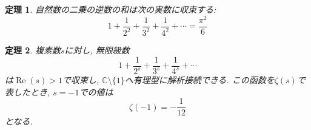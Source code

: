 \documentclass[dvipdfmx]{jsarticle}
\newtheorem{them}{定理}
\begin{document}
  \begin{them}
    自然数の二乗の逆数の和は次の実数に収束する:
    \[
      1 + \frac{1}{2^2} + \frac{1}{3^2} + \frac{1}{4^2} + \cdots = \frac{\pi^2}{6}
    \]
  \end{them}

  \begin{them}
    複素数$s$に対し, 無限級数
    \[
      1 + \frac{1}{2^s} + \frac{1}{3^s} + \frac{1}{4^s} + \cdots
    \]
    は$\operatorname{Re}(s)>1$で収束し, $\mathbb{C}\setminus\{1\}$へ有理型に解析接続できる. この函数を$\zeta(s)$で表したとき, $s=-1$での値は
    \[
      \zeta(-1) = -\frac{1}{12}
    \]
    となる.
  \end{them}
\end{document}
